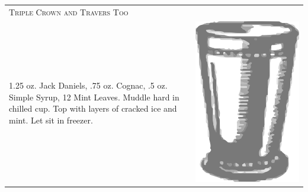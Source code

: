 \documentclass{article}
\begin{document}
\begin{tabular}{p{2in} p{0.5in}}
\multicolumn{2}{p{3in}}{\centering\Huge\textsc{Triple Crown and Travers Too}} \\ 
  \vspace{-0.1in}1.25 oz. Jack Daniels, .75 oz. Cognac, .5 oz. Simple Syrup, 12 Mint Leaves. Muddle hard in chilled cup. Top with layers of cracked ice and mint. Let sit in freezer. &
  \vspace{-0.1in} \includegraphics{julep.png}
\end{tabular}
\end{document}
